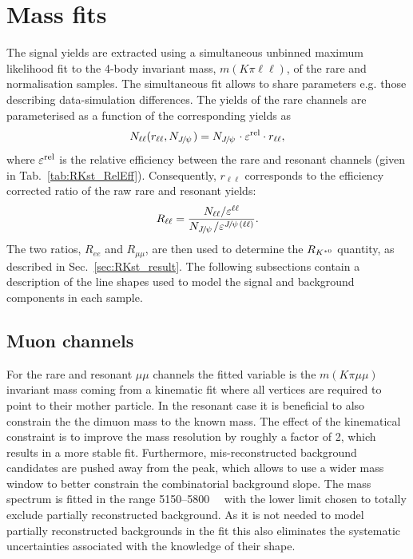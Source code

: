 \section{Mass fits}
\label{sec:rkst_fits}

The signal yields are extracted using a simultaneous unbinned maximum likelihood fit
to the 4-body invariant mass, $m(K\pi\ell\ell)$, of the rare and normalisation samples.
The simultaneous fit allows to share parameters e.g. those describing data-simulation differences.
The yields of the rare channels are parameterised as a function of the corresponding \jpsi yields as
%
\begin{equation}
N_{\ell\ell}(r_{\ell\ell}, N_{\jpsi}) = N_{\jpsi} \cdot \varepsilon^{\rm rel} \cdot r_{\ell\ell},
\end{equation}
%
where $\varepsilon^{\rm rel}$ is the relative efficiency between the rare and resonant channels
(given in Tab.~\ref{tab:RKst_RelEff}). Consequently, $r_{\ell\ell}$ corresponds to the efficiency corrected
ratio of the raw rare and resonant yields:
%
\begin{equation}
R_{\ell\ell} = \frac{N_{\ell\ell} / \varepsilon^{\ell\ell}}{N_{\jpsi} / \varepsilon^{\jpsi(\ell\ell)}}.
\end{equation}
%
The two ratios, $R_{ee}$ and $R_{\mu\mu}$, are then used to determine
the $R_{{{K}^{*0}}}$ quantity, as described in Sec.~\ref{sec:RKst_result}.
The following subsections contain a description of the line shapes used to model
the signal and background components in each sample.

\subsection{Muon channels}

For the rare and resonant $\mu\mu$ channels the fitted variable is the $m(K\pi \mu\mu)$ invariant mass coming
from a kinematic fit where all vertices are required to point to their mother particle.
In the resonant case it is beneficial to also constrain the the dimuon mass to the known \jpsi mass.
The effect of the kinematical constraint is to improve the mass resolution by roughly a factor of 2, which results
in a more stable fit. Furthermore, mis-reconstructed background candidates are pushed away from
the \Bz peak, which allows to use a wider mass window to better constrain the combinatorial background slope.
The mass spectrum is fitted in the range 5150--5800~\mevcc~ with the lower limit
chosen to totally exclude partially reconstructed background.
As it is not needed to model partially reconstructed backgrounds in the fit this also
eliminates the systematic uncertainties associated with the knowledge of their shape. 

